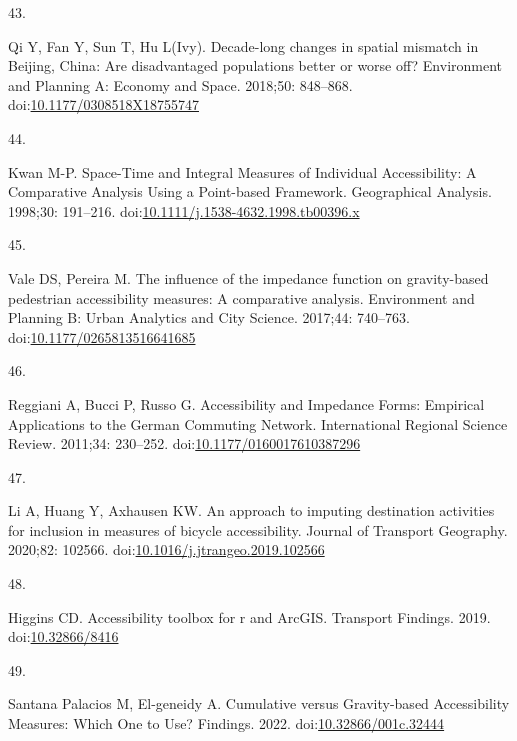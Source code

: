 \documentclass[10pt,letterpaper]{article}
\newlength{\cslhangindent}
\newlength{\csllabelwidth}
\newlength{\cslentryspacingunit} %
\newenvironment{CSLReferences}[2] %
 {%
  \setlength{\parindent}{0pt}
  \ifodd #1
  \let\oldpar\par
  \def\par{\hangindent=\cslhangindent\oldpar}
  \fi
  \setlength{\parskip}{#2\cslentryspacingunit}
 }%
 {}
\newcommand{\CSLLeftMargin}[1]{\parbox[t]{\csllabelwidth}{#1}}
\newcommand{\CSLRightInline}[1]{\parbox[t]{\linewidth - \csllabelwidth}{#1}\break}
\begin{document}
\begin{CSLReferences}{0}{0}
\leavevmode{}%
\CSLLeftMargin{43. }%
\CSLRightInline{Qi Y, Fan Y, Sun T, Hu L(Ivy). Decade-long changes in
spatial mismatch in {Beijing}, {China}: {Are} disadvantaged populations
better or worse off? Environment and Planning A: Economy and Space.
2018;50: 848--868.
doi:\href{https://doi.org/10.1177/0308518X18755747}{10.1177/0308518X18755747}}

\leavevmode{}%
\CSLLeftMargin{44. }%
\CSLRightInline{Kwan M-P. Space-{Time} and {Integral} {Measures} of
{Individual} {Accessibility}: {A} {Comparative} {Analysis} {Using} a
{Point}-based {Framework}. Geographical Analysis. 1998;30: 191--216.
doi:\href{https://doi.org/10.1111/j.1538-4632.1998.tb00396.x}{10.1111/j.1538-4632.1998.tb00396.x}}

\leavevmode{}%
\CSLLeftMargin{45. }%
\CSLRightInline{Vale DS, Pereira M. The influence of the impedance
function on gravity-based pedestrian accessibility measures: {A}
comparative analysis. Environment and Planning B: Urban Analytics and
City Science. 2017;44: 740--763.
doi:\href{https://doi.org/10.1177/0265813516641685}{10.1177/0265813516641685}}

\leavevmode{}%
\CSLLeftMargin{46. }%
\CSLRightInline{Reggiani A, Bucci P, Russo G. Accessibility and
{Impedance} {Forms}: {Empirical} {Applications} to the {German}
{Commuting} {Network}. International Regional Science Review. 2011;34:
230--252.
doi:\href{https://doi.org/10.1177/0160017610387296}{10.1177/0160017610387296}}

\leavevmode{}%
\CSLLeftMargin{47. }%
\CSLRightInline{Li A, Huang Y, Axhausen KW. An approach to imputing
destination activities for inclusion in measures of bicycle
accessibility. Journal of Transport Geography. 2020;82: 102566.
doi:\href{https://doi.org/10.1016/j.jtrangeo.2019.102566}{10.1016/j.jtrangeo.2019.102566}}

\leavevmode{}%
\CSLLeftMargin{48. }%
\CSLRightInline{Higgins CD. Accessibility toolbox for r and ArcGIS.
Transport Findings. 2019.
doi:\href{https://doi.org/10.32866/8416}{10.32866/8416}}

\leavevmode{}%
\CSLLeftMargin{49. }%
\CSLRightInline{Santana Palacios M, El-geneidy A. Cumulative versus
Gravity-based Accessibility Measures: Which One to Use? Findings. 2022.
doi:\href{https://doi.org/10.32866/001c.32444}{10.32866/001c.32444}}


\end{CSLReferences}
\end{document}
